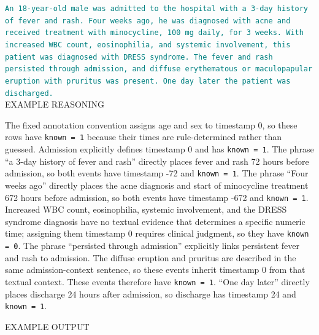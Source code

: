 \begin{tcolorbox}
\textcolor{teal}{\texttt{An 18-year-old male was admitted to the hospital with a 3-day history of fever and rash. Four weeks ago, he was diagnosed with acne and received treatment with minocycline, 100 mg daily, for 3 weeks. With increased WBC count, eosinophilia, and systemic involvement, this patient was diagnosed with DRESS syndrome. The fever and rash persisted through admission, and diffuse erythematous or maculopapular eruption with pruritus was present. One day later the patient was discharged.}} \\

\vspace{1em}
EXAMPLE REASONING
\vspace{0.2em}

The fixed annotation convention assigns age and sex to timestamp 0, so these rows have \texttt{known = 1} because their times are rule-determined rather than guessed. Admission explicitly defines timestamp 0 and has \texttt{known = 1}. The phrase ``a 3-day history of fever and rash'' directly places fever and rash 72 hours before admission, so both events have timestamp -72 and \texttt{known = 1}. The phrase ``Four weeks ago'' directly places the acne diagnosis and start of minocycline treatment 672 hours before admission, so both events have timestamp -672 and \texttt{known = 1}. Increased WBC count, eosinophilia, systemic involvement, and the DRESS syndrome diagnosis have no textual evidence that determines a specific numeric time; assigning them timestamp 0 requires clinical judgment, so they have \texttt{known = 0}. The phrase ``persisted through admission'' explicitly links persistent fever and rash to admission. The diffuse eruption and pruritus are described in the same admission-context sentence, so these events inherit timestamp 0 from that textual context. These events therefore have \texttt{known = 1}. ``One day later'' directly places discharge 24 hours after admission, so discharge has timestamp 24 and \texttt{known = 1}.

\vspace{2em}
EXAMPLE OUTPUT\\
\vspace{0.2em}


\end{tcolorbox}
